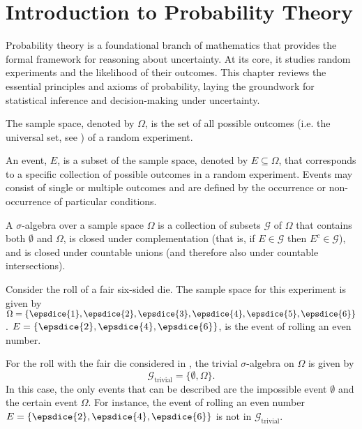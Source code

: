 \chapter{Introduction to Probability Theory}
\label{chp:probaiblity_theory}
Probability theory is a foundational branch of mathematics that provides the formal framework for reasoning about uncertainty. At its core, it studies random experiments and the likelihood of their outcomes. This chapter reviews the essential principles and axioms of probability, laying the groundwork for statistical inference and decision-making under uncertainty.

\begin{definition}
	\label{def:sample_space}
	The sample space, denoted by $\Omega$, is the set of all possible outcomes (i.e. the universal set, see ) of a random experiment.
\end{definition}

\begin{definition}[Event]
	An event, $E$, is a subset of the sample space, denoted by $E \subseteq \Omega$, that corresponds to a specific collection of possible outcomes in a random experiment. Events may consist of single or multiple outcomes and are defined by the occurrence or non-occurrence of particular conditions.
\end{definition}

\begin{definition}
	\label{def:sigma_algebra}
	A $\sigma$-algebra over a sample space $\Omega$ is a collection of subsets $\mathcal{G}$ of $\Omega$ that contains both $\emptyset$ and $\Omega$, is closed under complementation (that is, if $E \in \mathcal{G}$ then $E^c \in \mathcal{G}$), and is closed under countable unions (and therefore also under countable intersections).
\end{definition}

\begin{example}
	\label{ex:die1}
	Consider the roll of a fair six-sided die. The sample space for this experiment is given by $\Omega = \{ \epsdice{1}, \epsdice{2}, \epsdice{3}, \epsdice{4}, \epsdice{5}, \epsdice{6} \}$. $E = \{\epsdice{2}, \epsdice{4}, \epsdice{6}\}$, is the event of rolling an even number. 
\end{example}

\begin{example}
	\label{ex:die1a}
	For the roll with the fair die considered in , the trivial $\sigma$-algebra on $\Omega$ is given by
	\begin{equation}
		\mathcal{G}_{\text{trivial}} = \{\emptyset, \Omega\}.
	\end{equation}
	In this case, the only events that can be described are the impossible event $\emptyset$ and the certain event $\Omega$. For instance, the event of rolling an even number $E = \{\epsdice{2}, \epsdice{4}, \epsdice{6}\}$ is not in $\mathcal{G}_{\text{trivial}}$.
\end{example}

